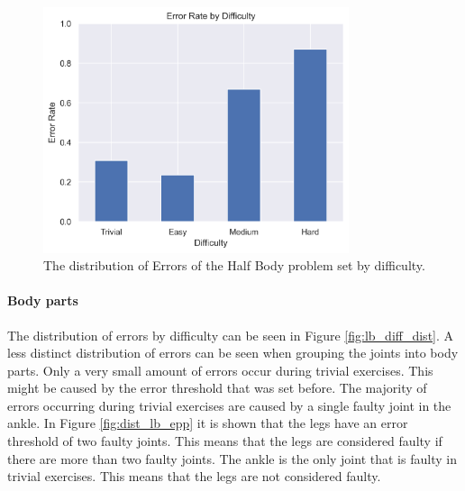 \begin{figure}[ht]
  \centering
  \includegraphics[width=0.8\textwidth]{figures/Data/dist_half_body/Error_Rate_by_Difficulty.png}
  \caption[Error Distribution of the Half Body by difficulty]{The distribution of Errors of the Half Body problem set by difficulty.}
  \label{fig:hb_diff_dist}
\end{figure}

\paragraph{Body parts}

The distribution of errors by difficulty can be seen in Figure \ref{fig:lb_diff_dist}. A less distinct distribution of errors can be seen when grouping the joints into body parts. Only a very small amount of errors occur during trivial exercises. This might be caused by the error threshold that was set before. The majority of errors occurring during trivial exercises are caused by a single faulty joint in the ankle. In Figure \ref{fig:dist_lb_epp} it is shown that the legs have an error threshold of two faulty joints. This means that the legs are considered faulty if there are more than two faulty joints. The ankle is the only joint that is faulty in trivial exercises. This means that the legs are not considered faulty.

